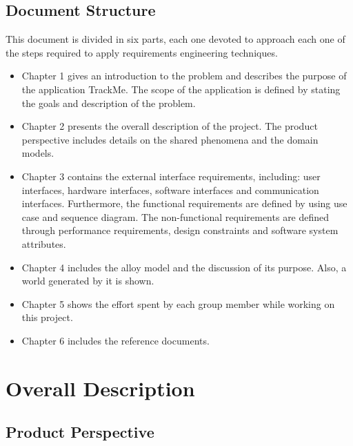 \documentclass[12pt]{article}
\begin{document}
\subsection{Document Structure}
This document is divided in six parts, each one devoted to approach each one of the steps required to apply requirements engineering techniques.\\
\begin{itemize}
\item Chapter 1 gives an introduction to the problem and describes the purpose of the application TrackMe. The scope of the application is defined by stating the goals and description of the problem.
\item Chapter 2 presents the overall description of the project. The product perspective includes details on the shared phenomena and the domain models.
\item Chapter 3 contains the external interface requirements, including: user interfaces, hardware interfaces, software interfaces and communication interfaces. Furthermore, the functional requirements are defined by using use case and sequence diagram. The non-functional requirements are defined through performance requirements, design constraints and software system attributes.
\item Chapter 4 includes the alloy model and the discussion of its purpose. Also, a world generated by it is shown.
\item Chapter 5 shows the effort spent by each group member while working on this project.
\item Chapter 6 includes the reference documents.

\end{itemize}

\section{Overall Description}
\subsection{Product Perspective}
\end{document}
